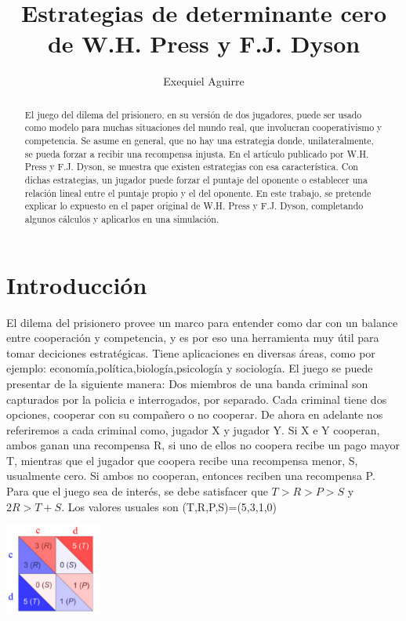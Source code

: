 \documentclass[12pt]{article}
\title{Estrategias de determinante cero de W.H. Press y F.J. Dyson}
\date{}
\author{Exequiel Aguirre}
\begin{document}
\maketitle

\begin{abstract}
El juego del dilema del prisionero, en su versión de dos jugadores, puede ser usado como modelo para 
muchas situaciones del mundo real, que involucran cooperativismo y competencia. Se asume en general, que no hay 
una estrategia donde, unilateralmente, se pueda forzar a recibir una recompensa injusta.\newline
En el artículo publicado por W.H. Press y F.J. Dyson, se muestra que existen estrategias con esa característica.
Con dichas estrategias, un jugador puede forzar el puntaje del oponente o establecer una relación lineal entre
el puntaje propio y el del oponente.\newline
En este trabajo, se pretende explicar lo expuesto en el paper original de W.H. Press y F.J. Dyson, completando
algunos cálculos y aplicarlos en una simulación.
\end{abstract}




\section{Introducción}
El dilema del prisionero provee un  marco para entender como dar con un balance entre cooperación y competencia, y es
por eso una herramienta muy útil para tomar deciciones estratégicas.
Tiene aplicaciones en diversas áreas, como por ejemplo: economía,política,biología,psicología y sociología.\newline
El juego se puede presentar de la siguiente manera:\newline
Dos miembros de una banda criminal son capturados por la policia e interrogados, por separado.
Cada criminal tiene dos opciones, cooperar con su compañero o no cooperar.
De ahora en adelante nos referiremos a cada criminal como, jugador X y jugador Y.
Si X e Y cooperan, ambos ganan una recompensa R, si uno de ellos no coopera recibe un pago mayor T, mientras que el
jugador que coopera recibe una recompensa menor, S, usualmente cero. Si ambos no cooperan, entonces reciben una recompensa P.
Para que el juego sea de interés, se debe satisfacer que $T >  R > P > S$ y $2R > T+S$.
Los valores usuales son (T,R,P,S)=(5,3,1,0)
\begin{center}
\includegraphics[height=3cm]{./pd.png}
\end{center}
\end{document}
